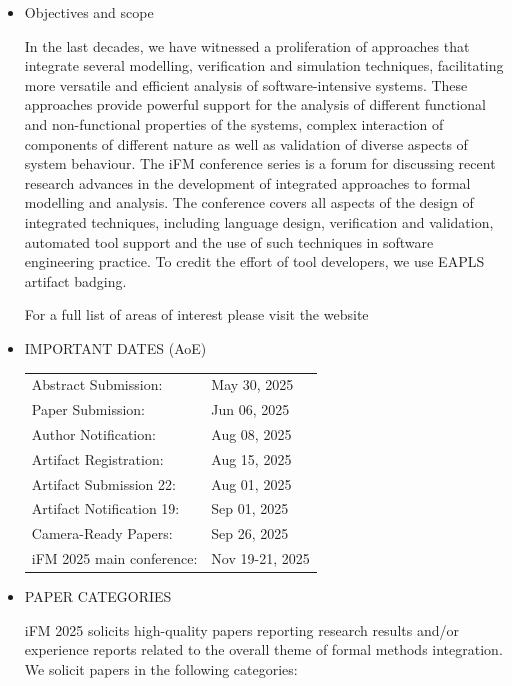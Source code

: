 \documentclass[prodmode,acmtecs]{acmsmall} %
\begin{document}
\begin{itemize}\item  Objectives and scope 
 
  In the last decades, we have witnessed a proliferation of approaches that integrate several modelling, verification and simulation techniques, facilitating more versatile and efficient analysis of software-intensive systems. These approaches provide powerful support for the analysis of different functional and non-functional properties of the systems, complex interaction of components of different nature as well as validation of diverse aspects of system behaviour. The iFM conference series is a forum for discussing recent research advances in the development of integrated approaches to formal modelling and analysis. The conference covers all aspects of the design of integrated techniques, including language design, verification and validation, automated tool support and the use of such techniques in software engineering practice. To credit the effort of tool developers, we use EAPLS artifact badging. 
 
  For a full list of areas of interest please visit the website 
 
\item  IMPORTANT DATES (AoE) 
 
\begin{tabulary}{\linewidth}{LL}Abstract Submission:  & May 30, 2025 \\
Paper Submission:  & Jun 06, 2025 \\
Author Notification:  & Aug 08, 2025 \\
Artifact Registration:  & Aug 15, 2025 \\
Artifact Submission 22:  & Aug 01, 2025 \\
Artifact Notification 19:  & Sep 01, 2025 \\
Camera-Ready Papers:  & Sep 26, 2025 \\
iFM 2025 main conference:  & Nov 19-21, 2025 \\
\end{tabulary}
 
\item  PAPER CATEGORIES  
 
  iFM 2025 solicits high-quality papers reporting research results and/or experience reports related to the overall theme of formal methods integration. We solicit papers in the following categories: 
 

\end{itemize}
\end{document}
